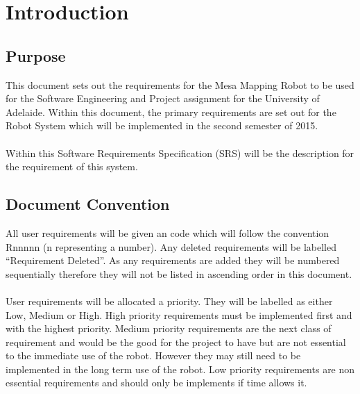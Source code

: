 \documentclass[11pt, a4paper]{article}
\begin{document}
\newpage


\setcounter{page}{1}

\section{Introduction}
\subsection{Purpose}
This document sets out the requirements for the Mesa Mapping Robot to be used for the Software Engineering and Project assignment for the University of Adelaide. Within this document, the primary requirements are set out for the Robot System which will be implemented in the second semester of 2015.\\
\\
Within this Software Requirements Specification (SRS) will be the description for the requirement of this system.

\subsection{Document Convention}
All user requirements will be given an code which will follow the convention Rnnnnn (n representing a number). Any deleted requirements will be labelled ``Requirement Deleted''. As any requirements are added they will be numbered sequentially therefore they will not be listed in ascending order in this document.\\
\\
User requirements will be allocated a priority. They will be labelled as either Low, Medium or High. High priority requirements must be implemented first and with the highest priority. Medium priority requirements are the next class of requirement and would be the good for the project to have but are not essential to the immediate use of the robot. However they may still need to be implemented in the long term use of the robot. Low priority requirements are non essential requirements and should only be implements if time allows it.
\end{document}

